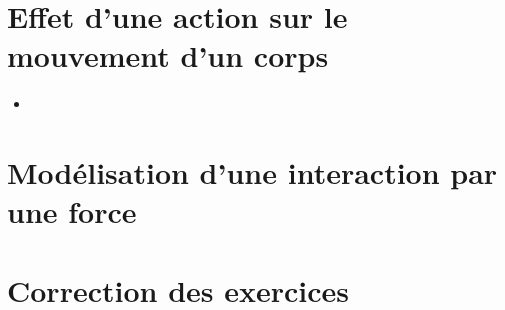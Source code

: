 \documentclass[12pt,a4paper]{article}
\date{}
\title{}
\begin{document}
	
	

\section{Effet d'une action sur le mouvement d'un corps}








\begin{myexos}
	\begin{itemize}
		\item 
	\end{itemize}
\end{myexos}

\newpage
\section{Modélisation d'une interaction par une force}





\appendix

\newpage

\section*{Correction des exercices}
\end{document}
